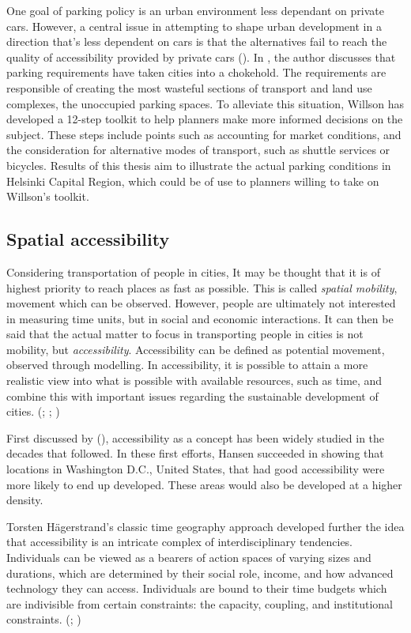 One goal of parking policy is an urban environment less dependant on private cars. However, a central issue in attempting to shape urban development in a direction that's less dependent on cars is that the alternatives fail to reach the quality of accessibility provided by private cars (\cite{Bertolini2003}). In , the author discusses that parking requirements have taken cities into a chokehold. The requirements are responsible of creating the most wasteful sections of transport and land use complexes, the unoccupied parking spaces. To alleviate this situation, Willson has developed a 12-step toolkit to help planners make more informed decisions on the subject. These steps include points such as accounting for market conditions, and the consideration for alternative modes of transport, such as shuttle services or bicycles. Results of this thesis aim to illustrate the actual parking conditions in Helsinki Capital Region, which could be of use to planners willing to take on Willson's toolkit.

\subsection{Spatial accessibility}
\justify

Considering transportation of people in cities, It may be thought that it is of highest priority to reach places as fast as possible. This is called \textit{spatial mobility}, movement which can be observed. However, people are ultimately not interested in measuring time units, but in social and economic interactions. It can then be said that the actual matter to focus in transporting people in cities is not mobility, but \textit{accessibility}. Accessibility can be defined as potential movement, observed through modelling. In accessibility, it is possible to attain a more realistic view into what is possible with available resources, such as time, and combine this with important issues regarding the sustainable development of cities. (\cite{Hodge1997}; \cite{Tenkanen2017}; \cite{Cervero2017})

First discussed by \citeauthor{Hansen1959} (\citeyear{Hansen1959}), accessibility as a concept has been widely studied in the decades that followed. In these first efforts, Hansen succeeded in showing that locations in Washington D.C., United States, that had good accessibility were more likely to end up developed. These areas would also be developed at a higher density.

Torsten Hägerstrand's classic time geography approach developed further the idea that accessibility is an intricate complex of interdisciplinary tendencies. Individuals can be viewed as a bearers of action spaces of varying sizes and durations, which are determined by their social role, income, and how advanced technology they can access. Individuals are bound to their time budgets which are indivisible from certain constraints: the capacity, coupling, and institutional constraints. (\cite{Wegener1999}; \cite{Hagerstrand1970})


